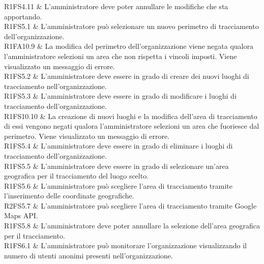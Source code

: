 R1FS4.11 & L'amministratore deve poter annullare le modifiche che sta apportando. \\




R1FS5.1 & L'amministratore può selezionare un nuovo perimetro di tracciamento dell'organizzazione.\\

R1FA10.9 & La modifica del perimetro dell'organizzazione viene negata qualora l'amministratore selezioni un area che non rispetta i vincoli imposti. Viene visualizzato un messaggio di errore. \\

R1FS5.2 & L'amministratore deve essere in grado di creare dei nuovi luoghi di tracciamento nell'organizzazione. \\

R1FS5.3 & L'amministratore deve essere in grado di modificare i luoghi di tracciamento dell'organizzazione. \\

R1FS10.10 & La creazione di nuovi luoghi e la modifica dell'area di tracciamento di essi vengono negati qualora l'amministratore selezioni un area che fuoriesce dal perimetro. Viene visualizzato un messaggio di errore. \\

R1FS5.4 & L'amministratore deve essere in grado di eliminare i luoghi di tracciamento dell'organizzazione. \\

R1FS5.5 & L'amministratore deve essere in grado di selezionare un'area geografica per il tracciamento del luogo scelto. \\

R1FS5.6 &  L'amministratore può scegliere l'area di tracciamento tramite l'inserimento delle coordinate geografiche. \\

R2FS5.7 & L'amministratore può scegliere l'area di tracciamento tramite Google Maps API.\\

R1FS5.8 & L'amministratore deve poter annullare la selezione dell'area geografica per il tracciamento.\\

R1FS6.1 & L'amministratore può monitorare l'organizzazione visualizzando il numero di utenti anonimi presenti nell'organizzazione. \\

